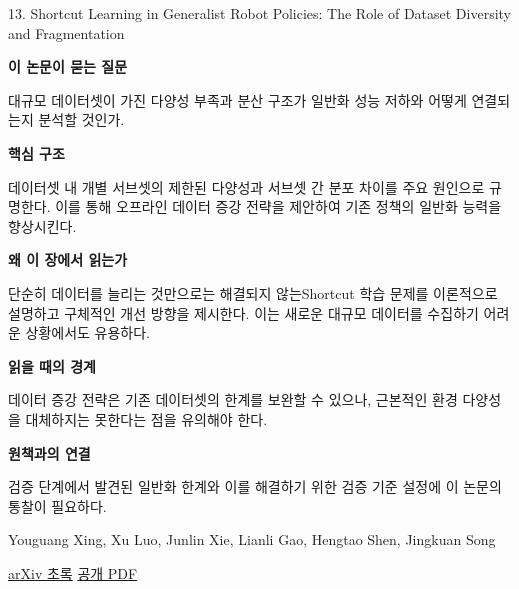 \documentclass[11pt,openany]{book}
\begin{document}
\begin{termcard}{13. Shortcut Learning in Generalist Robot Policies: The Role of Dataset Diversity and Fragmentation}

\par

\medskip

{\sffamily\bfseries\color{deepblue} 이 논문이 묻는 질문}\par

대규모 데이터셋이 가진 다양성 부족과 분산 구조가 일반화 성능 저하와 어떻게 연결되는지 분석할 것인가.

\smallskip

{\sffamily\bfseries\color{deepblue} 핵심 구조}\par

데이터셋 내 개별 서브셋의 제한된 다양성과 서브셋 간 분포 차이를 주요 원인으로 규명한다. 이를 통해 오프라인 데이터 증강 전략을 제안하여 기존 정책의 일반화 능력을 향상시킨다.

\smallskip

{\sffamily\bfseries\color{deepblue} 왜 이 장에서 읽는가}\par

단순히 데이터를 늘리는 것만으로는 해결되지 않는Shortcut 학습 문제를 이론적으로 설명하고 구체적인 개선 방향을 제시한다. 이는 새로운 대규모 데이터를 수집하기 어려운 상황에서도 유용하다.

\smallskip

{\sffamily\bfseries\color{coral} 읽을 때의 경계}\par

데이터 증강 전략은 기존 데이터셋의 한계를 보완할 수 있으나, 근본적인 환경 다양성을 대체하지는 못한다는 점을 유의해야 한다.

\smallskip

{\sffamily\bfseries\color{teal} 원책과의 연결}\par

검증 단계에서 발견된 일반화 한계와 이를 해결하기 위한 검증 기준 설정에 이 논문의 통찰이 필요하다.

\medskip

{\footnotesize\color{muted} Youguang Xing, Xu Luo, Junlin Xie, Lianli Gao, Hengtao Shen, Jingkuan Song\par

\href{https://arxiv.org/abs/2508.06426}{arXiv 초록} \quad \href{https://arxiv.org/pdf/2508.06426}{공개 PDF}\par}

\end{termcard}
\end{document}
